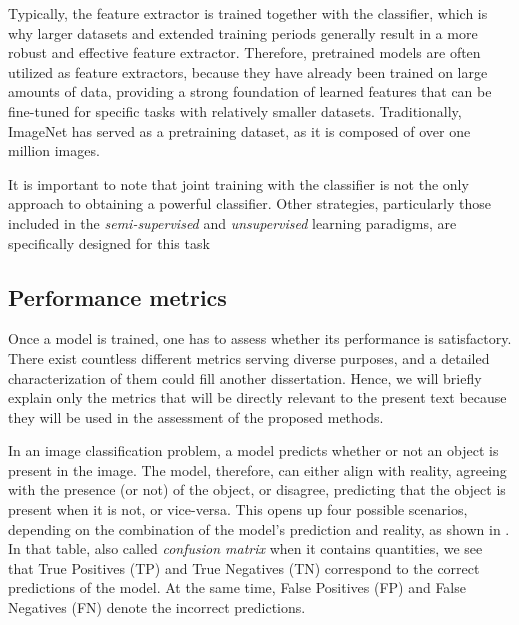 Typically, the feature extractor is trained together with the classifier, which is why larger datasets and extended training periods generally result in a more robust and effective feature extractor. Therefore, pretrained models are often utilized as feature extractors, because they have already been trained on large amounts of data, providing a strong foundation of learned features that can be fine-tuned for specific tasks with relatively smaller datasets. Traditionally, ImageNet has served as a pretraining dataset, as it is composed of over one million images.

It is important to note that joint training with the classifier is not the only approach to obtaining a powerful classifier. Other strategies, particularly those included in the \textit{semi-supervised} and \textit{unsupervised} learning paradigms, are specifically designed for this task

\subsection{Performance metrics}

Once a model is trained, one has to assess whether its performance is satisfactory. There exist countless different metrics serving diverse purposes, and a detailed characterization of them could fill another dissertation. Hence, we will briefly explain only the metrics that will be directly relevant to the present text because they will be used in the assessment of the proposed methods.

In an image classification problem, a model predicts whether or not an object is present in the image. The model, therefore, can either align with reality, agreeing with the presence (or not) of the object, or disagree, predicting that the object is present when it is not, or vice-versa. This opens up four possible scenarios, depending on the combination of the model's prediction and reality, as shown in . In that table, also called \textit{confusion matrix} when it contains quantities, we see that True Positives (TP) and True Negatives (TN) correspond to the correct predictions of the model. At the same time, False Positives (FP) and False Negatives (FN) denote the incorrect predictions.

